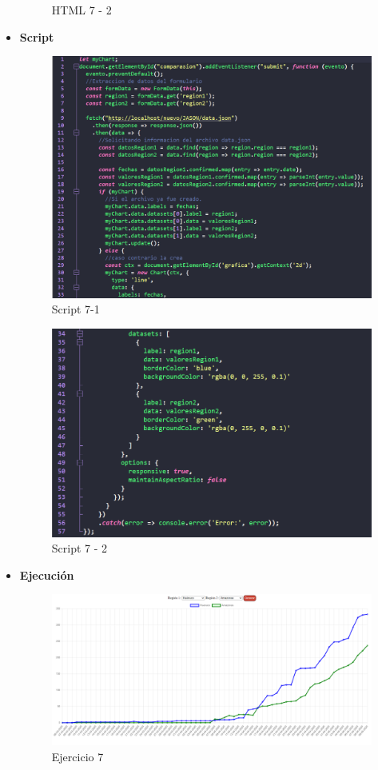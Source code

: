 \documentclass{article}
\begin{document}
\begin{itemize}
\begin{figure}[H]
			\caption{HTML 7 - 2}
		\end{figure}
		\newpage
		\item \textbf{Script}
		\begin{figure}[H]
			\centering
			\includegraphics[width=1\textwidth,keepaspectratio]{img/Script7-1.png}
			\caption{Script 7-1}
		\end{figure}
		\begin{figure}[H]
			\centering
			\includegraphics[width=1\textwidth,keepaspectratio]{img/Script7-2.png}
			\caption{Script 7 - 2}
		\end{figure}
		\item \textbf{Ejecución}
		\begin{figure}[H]
			\centering
			\includegraphics[width=1\textwidth,keepaspectratio]{img/Ejecucion7.png}
			\caption{Ejercicio 7}
		\end{figure}
	\end{itemize}
\end{document}

